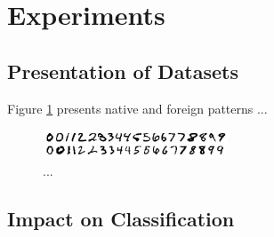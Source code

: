 \documentclass{llncs}
\begin{document}
\section{Experiments}
  \label{sec:Experiments}

\subsection{Presentation of Datasets}

Figure \ref{fig:nativeforeignpatterns} presents native and foreign patterns ...

\begin{figure}[!t]
  \centering
  \includegraphics[width=0.49\textwidth]{_Figures/native}
  \caption{...}
\label{fig:nativeforeignpatterns}
\end{figure}


\subsection{Impact on Classification}

\end{document}
